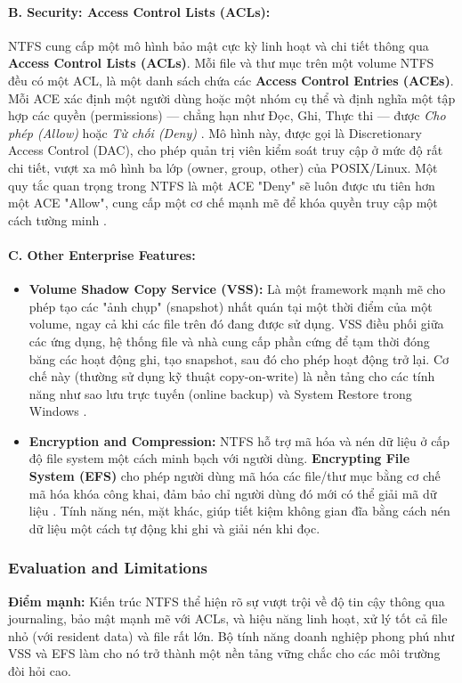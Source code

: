 \documentclass[12pt]{article}
\begin{document}
\paragraph{B. Security: Access Control Lists (ACLs):}
NTFS cung cấp một mô hình bảo mật cực kỳ linh hoạt và chi tiết thông qua \textbf{Access Control Lists (ACLs)}. Mỗi file và thư mục trên một volume NTFS đều có một ACL, là một danh sách chứa các \textbf{Access Control Entries (ACEs)}. Mỗi ACE xác định một người dùng hoặc một nhóm cụ thể và định nghĩa một tập hợp các quyền (permissions) --- chẳng hạn như Đọc, Ghi, Thực thi --- được \textit{Cho phép (Allow)} hoặc \textit{Từ chối (Deny)} \parencite{SettingAccessControlLists}. Mô hình này, được gọi là Discretionary Access Control (DAC), cho phép quản trị viên kiểm soát truy cập ở mức độ rất chi tiết, vượt xa mô hình ba lớp (owner, group, other) của POSIX/Linux. Một quy tắc quan trọng trong NTFS là một ACE "Deny" sẽ luôn được ưu tiên hơn một ACE "Allow", cung cấp một cơ chế mạnh mẽ để khóa quyền truy cập một cách tường minh \parencite{Allison1998}.

\paragraph{C. Other Enterprise Features:}
\begin{itemize}
    \item \textbf{Volume Shadow Copy Service (VSS):} Là một framework mạnh mẽ cho phép tạo các "ảnh chụp" (snapshot) nhất quán tại một thời điểm của một volume, ngay cả khi các file trên đó đang được sử dụng. VSS điều phối giữa các ứng dụng, hệ thống file và nhà cung cấp phần cứng để tạm thời đóng băng các hoạt động ghi, tạo snapshot, sau đó cho phép hoạt động trở lại. Cơ chế này (thường sử dụng kỹ thuật copy-on-write) là nền tảng cho các tính năng như sao lưu trực tuyến (online backup) và System Restore trong Windows \parencite{MicrosoftVSS}.
    \item \textbf{Encryption and Compression:} NTFS hỗ trợ mã hóa và nén dữ liệu ở cấp độ file system một cách minh bạch với người dùng. \textbf{Encrypting File System (EFS)} cho phép người dùng mã hóa các file/thư mục bằng cơ chế mã hóa khóa công khai, đảm bảo chỉ người dùng đó mới có thể giải mã dữ liệu \parencite{WafaTech2025EFS}. Tính năng nén, mặt khác, giúp tiết kiệm không gian đĩa bằng cách nén dữ liệu một cách tự động khi ghi và giải nén khi đọc.
\end{itemize}

\subsubsection{Evaluation and Limitations}
\textbf{Điểm mạnh:} Kiến trúc NTFS thể hiện rõ sự vượt trội về độ tin cậy thông qua journaling, bảo mật mạnh mẽ với ACLs, và hiệu năng linh hoạt, xử lý tốt cả file nhỏ (với resident data) và file rất lớn. Bộ tính năng doanh nghiệp phong phú như VSS và EFS làm cho nó trở thành một nền tảng vững chắc cho các môi trường đòi hỏi cao.
\end{document}
